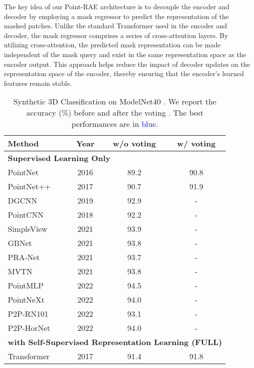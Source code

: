\documentclass[sigconf, screen]{acmart}
\begin{document}
The key idea of our Point-RAE architecture is to decouple the encoder and decoder by employing a mask regressor to predict the representation of the masked patches. Unlike the standard Transformer used in the encoder and decoder, the mask regressor comprises a series of cross-attention layers. By utilizing cross-attention, the predicted mask representation can be made independent of the mask query and exist in the same representation space as the encoder output. This approach helps reduce the impact of decoder updates on the representation space of the encoder, thereby ensuring that the encoder's learned features remain stable.

\begin{table}
\caption{
 Synthetic 3D Classification on ModelNet40 \cite{wu20153d}. We
report the accuracy (\%) before and after the voting \cite{liu2019relation}. The best performances are in \textcolor{blue}{blue}.
}
\centering
\begin{tabular}{@{}lccc}
\toprule[1pt]
Method &Year& w/o voting  &  w/ voting
\\
\midrule[0.5pt]
\multicolumn{4}{l}{
\hspace{-0.5em}\textbf{Supervised Learning Only}}
\\
PointNet \cite{qi2017pointnet} &2016&89.2& 90.8 \\
PointNet++ \cite{qi2017pointnet++} &2017&90.7& 91.9\\
DGCNN \cite{wang2019dynamic} &2019&92.9& - \\
PointCNN \cite{li2018pointcnn} &2018&92.2 &-   \\
SimpleView \cite{goyal2021revisiting}&2021 &93.9 &-   \\
GBNet \cite{qiu2021geometric} &2021&93.8& -  \\
PRA-Net \cite{cheng2021net} &2021&93.7& -  \\
MVTN \cite{hamdi2021mvtn} &2021&93.8 &- \\
PointMLP \cite{ma2022rethinking}&2022 &94.5& -  \\
PointNeXt \cite{qian2022pointnext} &2022&94.0& -  \\
P2P-RN101 \cite{wang2022p2p} &2022&93.1& -\\
P2P-HorNet \cite{wang2022p2p} &2022&94.0& -  \\
\midrule[0.5pt]
\multicolumn{4}{l}{\hspace{-0.5em}\textbf{with Self-Supervised Representation Learning (FULL)}}
\\
Transformer \cite{vaswani2017attention} &2017&91.4 &91.8 \\

\end{tabular}
\end{table}
\end{document}
